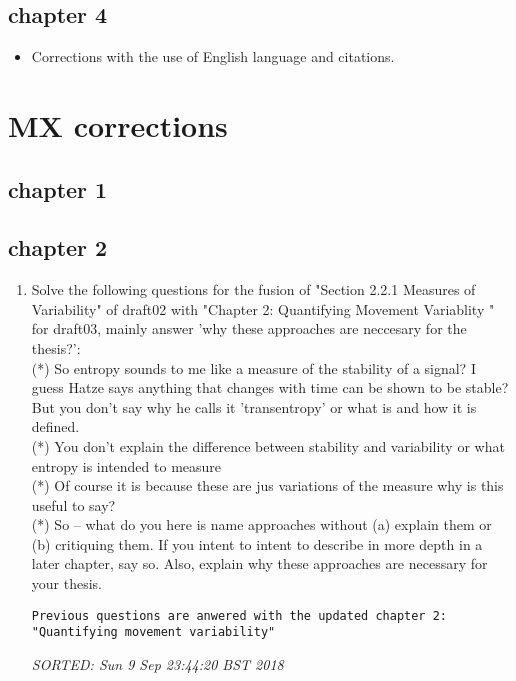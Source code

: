 \documentclass[10pt]{article}
\begin{document}
\subsection{chapter 4}

\begin{itemize}[noitemsep,topsep=0pt]
\item Corrections with the use of English language
	and citations.
\end{itemize}






\section{MX corrections}

\subsection{chapter 1}





\subsection{chapter 2}


\begin{enumerate}

\item Solve the following questions for the fusion of 
	"Section 2.2.1 Measures of Variability" of draft02 
	with "Chapter 2: Quantifying Movement Variablity " for draft03,
	mainly answer 'why these approaches are neccesary for the thesis?':
	\\ (*) So entropy sounds to me like a measure of the stability 
	of a signal?
	I guess Hatze says anything that changes with time can be shown 
	to be stable?
	But you don't say why he calls it 'transentropy'
	or what is and how it is defined. 
	\\ (*) You don't explain the difference between stability and variability
	or what entropy is intended to measure
	\\ (*) Of course it is because these are jus variations of the measure 
	why is this useful to say? 
	\\ (*) So -- what do you here is name approaches without 
	(a) explain them or 
	(b) critiquing them.
	If you intent to intent to describe in more depth in a later chapter, say so.
	Also, explain why these approaches are necessary for 
	your thesis.

\begin{verbatim}
Previous questions are anwered with the updated chapter 2: 
"Quantifying movement variability"
\end{verbatim}
\textit{
SORTED: Sun  9 Sep 23:44:20 BST 2018
}

	
\end{enumerate}
\end{document}
